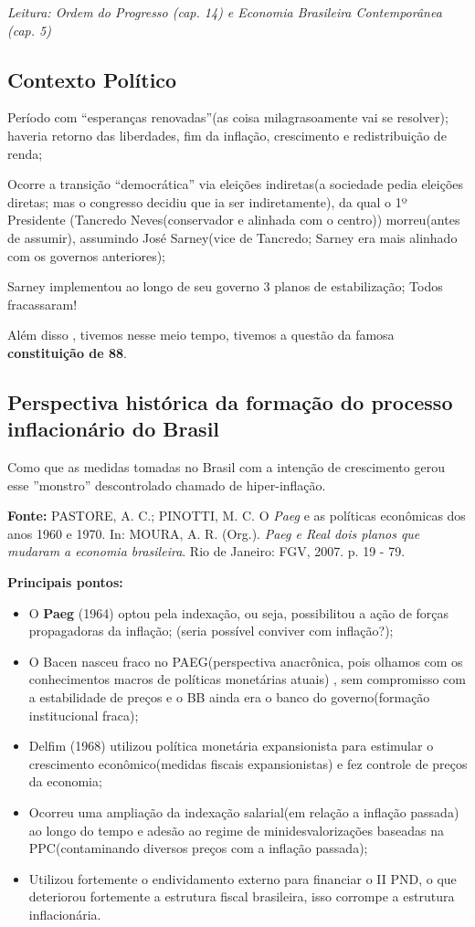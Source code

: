 \documentclass[a4paper,12pt]{article}[abntex2]
\begin{document}
\textit{Leitura: Ordem do Progresso (cap. 14) e Economia Brasileira Contemporânea (cap. 5)}

\subsection{\textbf{Contexto Político}}

Período com ``esperanças renovadas''(as coisa milagrasoamente vai se resolver); haveria retorno das liberdades, fim da inflação, crescimento e redistribuição de renda;

Ocorre a transição ``democrática'' via eleições indiretas(a sociedade pedia eleições diretas; mas o congresso decidiu que ia ser indiretamente), da qual o 1º Presidente (Tancredo Neves(conservador e alinhada com o centro)) morreu(antes de assumir), assumindo José Sarney(vice de Tancredo; Sarney era mais alinhado com os governos anteriores);

Sarney implementou ao longo de seu governo 3 planos de estabilização; Todos fracassaram!

Além disso , tivemos nesse meio tempo, tivemos a questão da famosa \textbf{constituição de 88}.

\subsection{\textbf{Perspectiva histórica da formação do processo inflacionário do Brasil}}

Como que as medidas tomadas no Brasil com a intenção de crescimento gerou esse ''monstro'' descontrolado chamado de hiper-inflação.  

\textbf{Fonte:} PASTORE, A. C.; PINOTTI, M. C. O \textit{Paeg} e as políticas econômicas dos anos 1960 e 1970. In: MOURA, A. R. (Org.). \textit{Paeg e Real dois planos que mudaram a economia brasileira}. Rio de Janeiro: FGV, 2007. p. 19 - 79.

\textbf{Principais pontos:}\begin{itemize}
    \item O \textbf{Paeg} (1964) optou pela indexação, ou seja, possibilitou a ação de forças propagadoras da inflação; (seria possível conviver com inflação?);
    \item O Bacen nasceu fraco no PAEG(perspectiva anacrônica, pois olhamos com os conhecimentos macros de políticas monetárias atuais) , sem compromisso com a estabilidade de preços e o BB ainda era o banco do governo(formação institucional fraca);
    \item Delfim (1968) utilizou política monetária expansionista para estimular o crescimento econômico(medidas fiscais expansionistas) e fez controle de preços da economia; 
    \item Ocorreu uma ampliação da indexação salarial(em relação a inflação passada) ao longo do tempo e adesão ao regime de minidesvalorizações baseadas na PPC(contaminando diversos preços com a inflação passada);
    \item Utilizou fortemente o endividamento externo para financiar o II PND, o que deteriorou fortemente a estrutura fiscal brasileira, isso corrompe a estrutura inflacionária.
\end{itemize}
\end{document}
